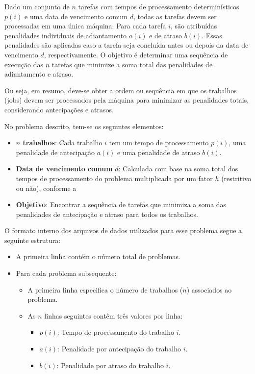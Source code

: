 \documentclass[12pt]{article}
\begin{document}
Dado um conjunto de $n$ tarefas com tempos de processamento determinísticos $p(i)$ e uma data de vencimento comum $d$, todas as tarefas devem ser processadas em uma única máquina. Para cada tarefa $i$, são atribuídas penalidades individuais de adiantamento $a(i)$ e de atraso $b(i)$. Essas penalidades são aplicadas caso a tarefa seja concluída antes ou depois da data de vencimento $d$, respectivamente. O objetivo é determinar uma sequência de execução das $n$ tarefas que minimize a soma total das penalidades de adiantamento e atraso.

Ou seja, em resumo, deve-se obter a ordem ou sequência em que os trabalhos (jobs) devem ser processados pela máquina para minimizar as penalidades totais, considerando antecipações e atrasos.

No problema descrito, tem-se os seguintes elementos:

\begin{itemize}
\item \textbf{$n$ trabalhos}: Cada trabalho $i$ tem um tempo de processamento $p(i)$, uma penalidade de antecipação $a(i)$ e uma penalidade de atraso $b(i)$.
\item \textbf{Data de vencimento comum} $d$: Calculada com base na soma total dos tempos de processamento do problema multiplicada por um fator $h$ (restritivo ou não), conforme a  
\item \textbf{Objetivo}: Encontrar a sequência de tarefas que minimiza a soma das penalidades de antecipação e atraso para todos os trabalhos.
\end{itemize}


O formato interno dos arquivos de dados utilizados para esse problema segue a seguinte estrutura:

\begin{itemize}
    \item A primeira linha contém o número total de problemas.
    \item Para cada problema subsequente:
    \begin{itemize}
        \item A primeira linha especifica o número de trabalhos ($n$) associados ao problema.
        \item As $n$ linhas seguintes contêm três valores por linha: 
        \begin{itemize}
            \item $p(i)$: Tempo de processamento do trabalho $i$.
            \item $a(i)$: Penalidade por antecipação do trabalho $i$.
            \item $b(i)$: Penalidade por atraso do trabalho $i$.
        \end{itemize}
    \end{itemize}
\end{itemize}
\end{document}
